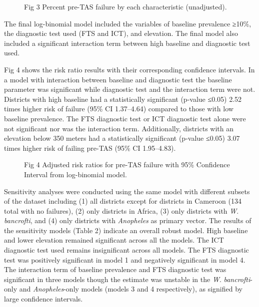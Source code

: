 \documentclass[11pt,a4paper]{article}
\begin{document}
\begin{figure}[h]
\caption{Fig 3 Percent pre-TAS failure by each characteristic (unadjusted).}
\end{figure}

The final log-binomial model included the variables of baseline prevalence ≥10\%, the diagnostic test used (FTS and ICT), and elevation. The final model also included a significant interaction term between high baseline and diagnostic test used.

Fig 4 shows the risk ratio results with their corresponding confidence intervals. In a model with interaction between baseline and diagnostic test the baseline parameter was significant while diagnostic test and the interaction term were not. Districts with high baseline had a statistically significant (p-value ≤0.05) 2.52 times higher risk of failure (95\% CI 1.37–4.64) compared to those with low baseline prevalence. The FTS diagnostic test or ICT diagnostic test alone were not significant nor was the interaction term. Additionally, districts with an elevation below 350 meters had a statistically significant (p-value ≤0.05) 3.07 times higher risk of failing pre-TAS (95\% CI 1.95–4.83).

\begin{figure}[h]
\caption{Fig 4 Adjusted risk ratios for pre-TAS failure with 95\% Confidence Interval from log-binomial model.}
\end{figure}

Sensitivity analyses were conducted using the same model with different subsets of the dataset including (1) all districts except for districts in Cameroon (134 total with no failures), (2) only districts in Africa, (3) only districts with \textit{W}. \textit{bancrofti}, and (4) only districts with \textit{Anopheles} as primary vector. The results of the sensitivity models (Table 2) indicate an overall robust model. High baseline and lower elevation remained significant across all the models. The ICT diagnostic test used remains insignificant across all models. The FTS diagnostic test was positively significant in model 1 and negatively significant in model 4. The interaction term of baseline prevalence and FTS diagnostic test was significant in three models though the estimate was unstable in the \textit{W}. \textit{bancrofti}-only and \textit{Anopheles}-only models (models 3 and 4 respectively), as signified by large confidence intervals.
\end{document}
